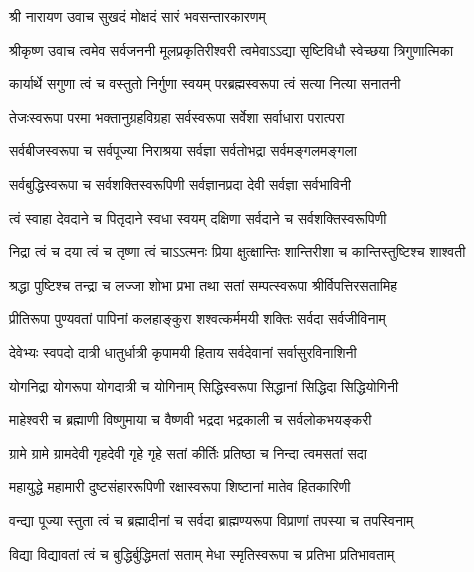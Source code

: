 
श्री नारायण उवाच\nopagebreak[4]
{सुखदं मोक्षदं सारं भवसन्तारकारणम्}

श्रीकृष्ण उवाच\nopagebreak[4]
\twolineshloka
{त्वमेव सर्वजननी मूलप्रकृतिरीश्वरी}
{त्वमेवाऽऽद्या सृष्टिविधौ स्वेच्छया त्रिगुणात्मिका}

\twolineshloka
{कार्यार्थे सगुणा त्वं च वस्तुतो निर्गुणा स्वयम्}
{परब्रह्मस्वरूपा त्वं सत्या नित्या सनातनी}

\twolineshloka
{तेजःस्वरूपा परमा भक्तानुग्रहविग्रहा}
{सर्वस्वरूपा सर्वेशा सर्वाधारा परात्परा}

\twolineshloka
{सर्वबीजस्वरूपा च सर्वपूज्या निराश्रया}
{सर्वज्ञा सर्वतोभद्रा सर्वमङ्गलमङ्गला}

\twolineshloka
{सर्वबुद्धिस्वरूपा च सर्वशक्तिस्वरूपिणी}
{सर्वज्ञानप्रदा देवी सर्वज्ञा सर्वभाविनी}

\twolineshloka
{त्वं स्वाहा देवदाने च पितृदाने स्वधा स्वयम्}
{दक्षिणा सर्वदाने च सर्वशक्तिस्वरूपिणी}

\twolineshloka
{निद्रा त्वं च दया त्वं च तृष्णा त्वं चाऽऽत्मनः प्रिया}
{क्षुत्क्षान्तिः शान्तिरीशा च कान्तिस्तुष्टिश्च शाश्वती}

\twolineshloka
{श्रद्धा पुष्टिश्च तन्द्रा च लज्जा शोभा प्रभा तथा}
{सतां सम्पत्स्वरूपा श्रीर्विपत्तिरसतामिह}

\twolineshloka
{प्रीतिरूपा पुण्यवतां पापिनां कलहाङ्कुरा}
{शश्वत्कर्ममयी शक्तिः सर्वदा सर्वजीविनाम्}

\twolineshloka
{देवेभ्यः स्वपदो दात्री धातुर्धात्री कृपामयी}
{हिताय सर्वदेवानां सर्वासुरविनाशिनी}

\twolineshloka
{योगनिद्रा योगरूपा योगदात्री च योगिनाम्}
{सिद्धिस्वरूपा सिद्धानां सिद्धिदा सिद्धियोगिनी}

\twolineshloka
{माहेश्वरी च ब्रह्माणी विष्णुमाया च वैष्णवी}
{भद्रदा भद्रकाली च सर्वलोकभयङ्करी}

\twolineshloka
{ग्रामे ग्रामे ग्रामदेवी गृहदेवी गृहे गृहे}
{सतां कीर्तिः प्रतिष्ठा च निन्दा त्वमसतां सदा}

\twolineshloka
{महायुद्धे महामारी दुष्टसंहाररूपिणी}
{रक्षास्वरूपा शिष्टानां मातेव हितकारिणी}

\twolineshloka
{वन्द्या पूज्या स्तुता त्वं च ब्रह्मादीनां च सर्वदा}
{ब्राह्मण्यरूपा विप्राणां तपस्या च तपस्विनाम्}

\twolineshloka
{विद्या विद्यावतां त्वं च बुद्धिर्बुद्धिमतां सताम्}
{मेधा स्मृतिस्वरूपा च प्रतिभा प्रतिभावताम्}


